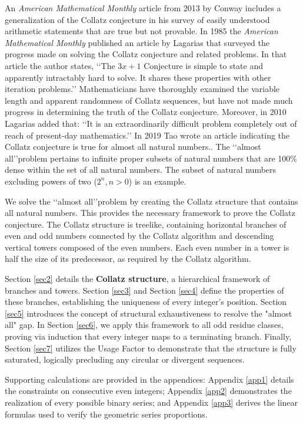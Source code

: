 \documentclass[sn-mathphys-num, pdflatex]{sn-jnl}
\begin{document}
An  \textit{American Mathematical Monthly} article from 2013 by Conway includes a generalization of the Collatz conjecture in his survey of easily understood arithmetic statements that are true but not provable\cite{b1}. In 1985 the \textit{American Mathematical Monthly} published an article by Lagarias that surveyed the progress made on solving the Collatz conjecture and related problems. In that article the author states, \lq\lq The $3x + 1$ Conjecture is simple to state and apparently intractably hard to solve. It shares these properties with other iteration problems.\rq\rq\cite{b2} Mathematicians have thoroughly examined the variable length and apparent randomness of Collatz sequences, but have not made much progress in determining the truth of the Collatz conjecture. Moreover, in 2010 Lagarias added that: \lq\lq It is an extraordinarily difficult problem completely out of reach of present-day mathematics.\rq\rq\cite{b3}   In 2019 Tao wrote an article indicating the Collatz conjecture is true for almost all natural numbers.\cite{b4}. The \lq\lq almost all\rq\rq problem pertains to infinite proper subsets of natural numbers that are 100\% dense within the set of all natural numbers. The subset of natural numbers excluding powers of two ($2^n, n > 0$) is an example.

 We solve the \lq\lq almost all\rq\rq problem by creating the Collatz structure that contains all natural numbers. This provides the necessary framework to prove the Collatz conjecture. The Collatz structure is treelike, containing horizontal branches of even and odd numbers connected by the Collatz algorithm and descending vertical towers composed of the even numbers. Each even number in a tower is half the size of its predecessor, as required by the Collatz algorithm. 
 
 Section \ref{sec2} details the \textbf{Collatz structure}, a hierarchical framework of branches and towers. Section \ref{sec3} and Section \ref{sec4} define the properties of these branches, establishing the uniqueness of every integer's position. Section \ref{sec5} introduces the concept of structural exhaustiveness to resolve the "almost all" gap. In Section \ref{sec6}, we apply this framework to all odd residue classes, proving via induction that every integer maps to a terminating branch. Finally, Section \ref{sec7} utilizes the Usage Factor to demonstrate that the structure is fully saturated, logically precluding any circular or divergent sequences.

Supporting calculations are provided in the appendices: Appendix \ref{app1} details the constraints on consecutive even integers; Appendix \ref{app2} demonstrates the realization of every possible binary series; and Appendix \ref{app3} derives the linear formulas used to verify the geometric series proportions. 
\end{document}
